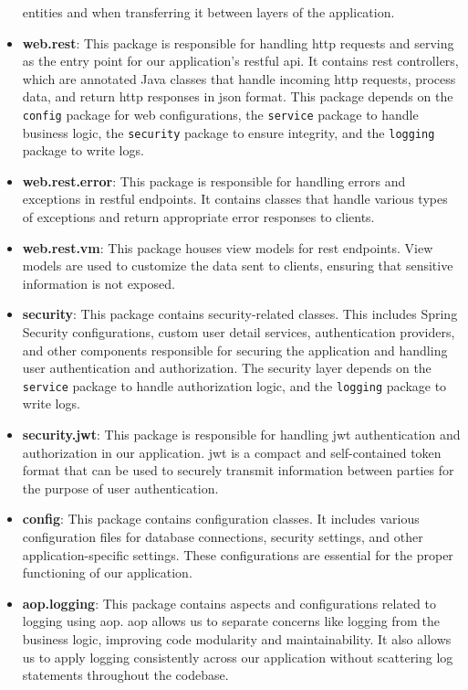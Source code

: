 \begin{itemize}
          entities and  when transferring it between layers of the application.
    \item \textbf{web.rest}: This package is responsible for handling \acrshort{http} requests and serving as the entry
          point for our application's \acrshort{rest}ful \acrshort{api}. It contains \acrshort{rest} controllers,
          which are annotated Java classes that handle incoming \acrshort{http} requests, process data,
          and return \acrshort{http} responses in \acrshort{json} format. This package depends on
          the \texttt{config} package for web configurations, the \texttt{service} package to handle business logic,
          the \texttt{security} package to ensure integrity, and the \texttt{logging} package to write logs.
    \item \textbf{web.rest.error}: This package is responsible for handling errors and exceptions in
          \acrshort{rest}ful endpoints. It contains classes that handle various types of exceptions
          and return appropriate error responses to clients.
    \item \textbf{web.rest.vm}: This package houses view models for \acrshort{rest} endpoints. View models
          are used to customize the data sent to clients, ensuring that sensitive information is not
          exposed.
    \item \textbf{security}: This package contains security-related classes. This includes Spring Security
          configurations, custom user detail services, authentication providers, and other components responsible
          for securing the application and handling user authentication and authorization. The security layer depends
          on the \texttt{service} package to handle authorization logic, and the \texttt{logging} package
          to write logs.
    \item \textbf{security.jwt}: This package is responsible for handling \acrfull{jwt} authentication
          and authorization in our application. \acrshort{jwt} is a compact and self-contained token
          format that can be used to securely transmit information between parties for the purpose
          of user authentication.
    \item \textbf{config}: This package contains configuration classes. It includes various configuration
          files for database connections, security settings, and other application-specific settings.
          These configurations are essential for the proper functioning of our application.
    \item \textbf{aop.logging}: This package contains aspects and configurations related to logging using
          \acrfull{aop}. \acrshort{aop} allows us to separate concerns like logging from the business logic,
          improving code modularity and maintainability. It also allows us to apply logging consistently
          across our application without scattering log statements throughout the codebase. \\
\end{itemize}


